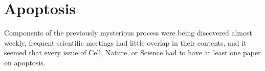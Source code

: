 \section{Apoptosis}

Components of the previously mysterious process were being discovered almost
weekly, frequent scientific meetings had little overlap in their contents, and
it seemed that every issue of Cell, Nature, or Science had to have at least one
paper on apoptosis.



